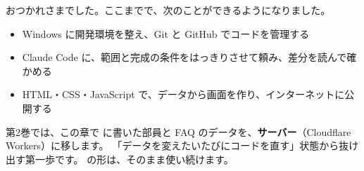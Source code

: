おつかれさまでした。ここまでで、次のことができるようになりました。

\begin{itemize}
  \item Windows に開発環境を整え、Git と GitHub でコードを管理する
  \item Claude Code に、範囲と完成の条件をはっきりさせて頼み、差分を読んで確かめる
  \item HTML・CSS・JavaScript で、データから画面を作り、インターネットに公開する
\end{itemize}

第2巻では、この章で  に書いた部員と FAQ のデータを、\textbf{サーバー}（Cloudflare Workers）に移します。
「データを変えたいたびにコードを直す」状態から抜け出す第一歩です。
 の形は、そのまま使い続けます。
